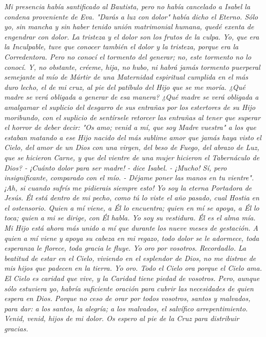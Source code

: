 \documentclass[12pt, twoside, openright]{book} %
\begin{document}
\emph{Mi presencia había santificado al Bautista, pero no había cancelado a Isabel la condena proveniente de Eva. "Darás a luz con dolor" había dicho el Eterno. Sólo yo, sin mancha y sin haber tenido unión matrimonial humana, quedé exenta de engendrar con dolor. La tristeza y el dolor son los frutos de la culpa. Yo, que era la Inculpable, tuve que conocer también el dolor y la tristeza, porque era la Corredentora. Pero no conocí el tormento del generar; no, este tormento no lo conocí. Y, no obstante, créeme, hija, no hubo, ni habrá jamás tormento puerperal semejante al mío de Mártir de una Maternidad espiritual cumplida en el más duro lecho, el de mi cruz, al pie del patíbulo del Hijo que se me moría. ¿Qué madre se verá obligada a generar de esa manera? ¿Qué madre se verá obligada a amalgamar el suplicio del desgarro de sus entrañas por los estertores de su Hijo moribundo, con el suplicio de sentírsele retorcer las entrañas al tener que superar el horror de deber decir: "Os amo; venid a mí, que soy Madre vuestra" a los que estaban matando a ese Hijo nacido del más sublime amor que jamás haya visto el Cielo, del amor de un Dios con una virgen, del beso de Fuego, del abrazo de Luz, que se hicieron Carne, y que del vientre de una mujer hicieron el Tabernáculo de Dios? - ¡Cuánto dolor para ser madre! - dice Isabel. - ¡Mucho! Sí, pero insignificante, comparado con el mío. - Déjame poner las manos en tu vientre". ¡Ah, si cuando sufrís me pidierais siempre esto! Yo soy la eterna Portadora de Jesús. Él está dentro de mi pecho, como tú lo viste el año pasado, cual Hostia en el ostensorio. Quien a mí viene, a Él lo encuentra; quien en mí se apoya, a Él lo toca; quien a mi se dirige, con Él habla. Yo soy su vestidura. Él es el alma mía. Mi Hijo está ahora más unido a mí que durante los nueve meses de gestación. A quien a mí viene y apoya su cabeza en mi regazo, todo dolor se le adormece, toda esperanza le florece, toda gracia le fluye. Yo oro por vosotros. Recordadlo. La beatitud de estar en el Cielo, viviendo en el esplendor de Dios, no me distrae de mis hijos que padecen en la tierra. Yo oro. Todo el Cielo ora porque el Cielo ama. El Cielo es caridad que vive, y la Caridad tiene piedad de vosotros. Pero, aunque sólo estuviera yo, habría suficiente oración para cubrir las necesidades de quien espera en Dios. Porque no ceso de orar por todos vosotros, santos y malvados, para dar: a los santos, la alegría; a los malvados, el salvífico arrepentimiento. Venid, venid, hijos de mi dolor. Os espero al pie de la Cruz para distribuir gracias. }
 
\end{document}
